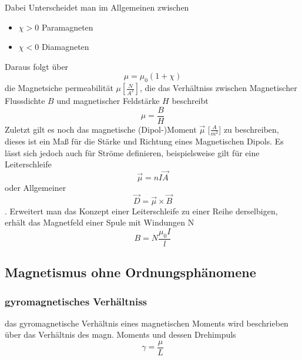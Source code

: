             Dabei Unterscheidet man im Allgemeinen zwischen
            \begin{itemize}
                \item $\chi > 0$ Paramagneten
                \item $\chi < 0$ Diamagneten
            \end{itemize}
            Daraus folgt über
            \begin{equation}
                \mu = \mu_0 (1 + \chi)
            \end{equation}
            die Magnetsiche permeabilität $\mu [\frac{N}{A^2}]$, die das Verhältniss zwischen Magnetischer Flussdichte $B$ und magnetischer Feldstärke $H$ beschreibt
            $$ \mu = \frac{B}{H}$$
            Zuletzt gilt es noch das magnetische (Dipol-)Moment $\vec{\mu}$ [$\frac{A}{m^2}$] zu beschreiben, dieses ist ein Maß für die Stärke
            und Richtung eines Magnetischen Dipols. Es lässt sich jedoch auch für Ströme definieren, beispielsweise gilt für eine
            Leiterschleife
            \begin{equation}
                \vec{\mu} = n I \vec{A}
            \end{equation}
            oder Allgemeiner 
            \begin{equation}
                \vec{D} = \vec{\mu} \times \vec{B}
            \end{equation}.
            Erweitert man das Konzept einer Leiterschleife zu einer Reihe derselbigen, erhält das Magnetfeld einer Spule mit Windungen N
            \begin{equation}
                B = N \frac{\mu_0 I}{l}
            \end{equation}
    \subsection{Magnetismus ohne Ordnungsphänomene}
        \subsubsection*{gyromagnetisches Verhältniss}
            das gyromagnetische Verhältnis eines magnetischen Moments wird beschrieben über das Verhältnis
            des magn. Moments und dessen Drehimpuls
            \begin{equation}
                \gamma = \frac{\mu}{L}
            \end{equation}
